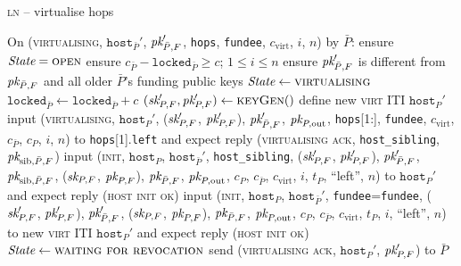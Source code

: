 \begin{center}
  \begin{processbox}{\textsc{ln} -- virtualise hops}
    \begin{algorithmic}[1]
      \State On (\textsc{virtualising}, $\texttt{host}_{\bar{P}}'$,
      $\textit{pk}_{\bar{P}, F}'$, \texttt{hops}, \texttt{fundee}, $c_{\mathrm{virt}}$,
      $i$, $n$) by $\bar{P}$:
      \Indent
        \State ensure $\itistate = \textsc{open}$
        \State ensure $c_{\bar{P}} - \texttt{locked}_{\bar{P}} \geq c$; $1 \leq
        i \leq n$
        \State ensure $\textit{pk}_{\bar{P}, F}'$ is different from $\textit{pk}_{\bar{P}, F}$ and
        all older $\bar{P}$'s funding public keys
        \State $\itistate \gets \textsc{virtualising}$
        \State $\texttt{locked}_{\bar{P}} \gets \texttt{locked}_{\bar{P}} + c$
        \State $(\textit{sk}_{P, F}', \textit{pk}_{P, F}') \gets \textsc{keyGen}()$
         
          \State define new \textsc{virt} ITI $\texttt{host}_P'$
          \State input (\textsc{virtualising}, $\texttt{host}_P'$, ($\textit{sk}_{P,
          F}'$, $\textit{pk}_{P, F}'$), $\textit{pk}_{\bar{P}, F}'$, $\textit{pk}_{P, \mathrm{out}}$,
          \texttt{hops}[1:], \texttt{fundee}, $c_{\mathrm{virt}}$,
          $c_{\bar{P}}$, $c_P$, $i$, $n$) to \texttt{hops}[1].\texttt{left} and
          expect reply (\textsc{virtualising ack}, \texttt{host\_sibling},
          $\textit{pk}_{\mathrm{sib}, \bar{P}, F}$)
          \State input (\textsc{init}, $\texttt{host}_P$,
          $\texttt{host}_{\bar{P}}'$, \texttt{host\_sibling}, ($\textit{sk}_{P, F}'$,
          $\textit{pk}_{P, F}'$), $\textit{pk}_{\bar{P}, F}'$, $\textit{pk}_{\mathrm{sib}, \bar{P}, F}$,
          ($\textit{sk}_{P, F}$, $\textit{pk}_{P, F}$), $\textit{pk}_{\bar{P}, F}$, $\textit{pk}_{P, \mathrm{out}}$,
          $c_P$, $c_{\bar{P}}$, $c_{\mathrm{virt}}$, $i$, $t_P$, ``left'', $n$)
          to $\texttt{host}_P'$ and expect reply (\textsc{host init ok})
        \Else \: 
          \State input (\textsc{init}, $\texttt{host}_P$,
          $\texttt{host}_{\bar{P}}'$, \texttt{fundee}=\texttt{fundee}, ($\textit{sk}_{P,
          F}'$, $\textit{pk}_{P, F}'$), $\textit{pk}_{\bar{P}, F}'$, ($\textit{sk}_{P, F}$, $\textit{pk}_{P, F}$),
          $\textit{pk}_{\bar{P}, F}$, $\textit{pk}_{P, \mathrm{out}}$, $c_P$, $c_{\bar{P}}$,
          $c_{\mathrm{virt}}$, $t_P$, $i$, ``left'', $n$) to new \textsc{virt}
          ITI $\texttt{host}_P'$ and expect reply (\textsc{host init ok})
        \EndIf
        \State $\itistate \gets \textsc{waiting for revocation}$
        \State send (\textsc{virtualising ack}, $\texttt{host}_P'$, $\textit{pk}_{P, F}'$)
        to $\bar{P}$
      \EndIndent
      \Statex


\end{algorithmic}
\end{processbox}
\end{center}
